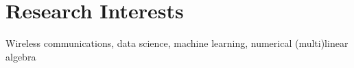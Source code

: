 \section{Research Interests}

Wireless communications, data science, machine learning, numerical (multi)linear algebra
